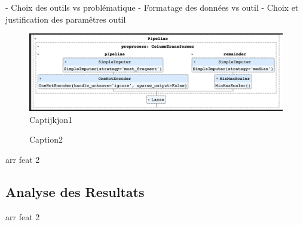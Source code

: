 \documentclass[12pt]{article}
\begin{document}
- Choix des outils vs problématique  
- Formatage des données vs outil  
- Choix et justification des paramêtres outil  


\begin{figure}
    \includegraphics[width=1.0 \linewidth]{media/edited/pipeline.png} 
    \caption{Captijkjon1}
    \label{fig:pipeline}
\end{figure}

\blindtext[3]



\begin{figure}
     
    \caption{Caption2}
    \label{fig:arr}
\end{figure}

\begin{table}
    
    \caption{arr feat 2}
    \label{tab:arrft2}

\end{table}


\begin{landscape}

    \section{Analyse des Resultats}

    \blindtext[6]
    \begin{table}
        \let\center\empty
        \let\endcenter\relax
        \centering
        \resizebox{.6\width}{!}{}
    \end{table} 

    \begin{table}
        
        \caption{arr feat 2}
        \label{tab:arrft1}
    \end{table} 


\end{landscape}
\end{document}
